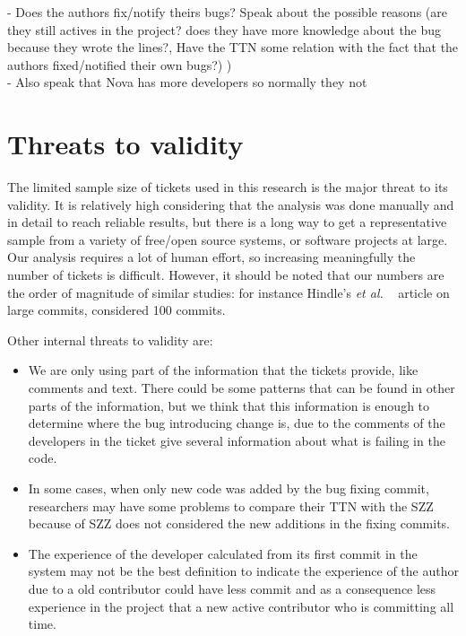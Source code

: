 \documentclass[10pt, conference]{IEEEtran}
\begin{document}
\vspace{0.2cm}
\vspace{0.1cm}

- Does the authors fix/notify theirs bugs? Speak about the possible reasons (are they still actives in the project? does they have more knowledge about the bug because they wrote the lines?, Have the TTN some relation with the fact that the authors fixed/notified their own bugs?) ) \\
- Also speak that Nova has more developers so normally they not 

\section{Threats to validity}
\label{sec:threats}
The limited sample size of tickets used in this research is the major threat to its validity. It is relatively high considering that the analysis was done manually and in detail to reach reliable results, but there is a long way to get a representative sample from a variety of free/open source systems, or software projects at large. Our analysis requires a lot of human effort, so increasing meaningfully the number of tickets is difficult. However, it should be noted that our numbers are the order of magnitude of similar studies: for instance Hindle's \emph{et al.} ~\cite{hindle2008large} article on large commits, considered 100 commits.

Other internal threats to validity are:

\begin{itemize}
    \item We are only using part of the information that the tickets provide, like comments and text. There could be some patterns that can be found in other parts of the information, but we think that this information is enough to determine where the bug introducing change is, due to the comments of the developers in the ticket give several information about what is failing in the code.
    \item In some cases, when only new code was added by the bug fixing commit, researchers may have some problems to compare their TTN with the SZZ because of SZZ does not considered the new additions in the fixing commits. 
    \item The experience of the developer calculated from its first commit in the system may not be the best definition to indicate the experience of the author due to a old contributor could have less commit and as a consequence less experience in the project that a new active contributor who is committing all time.
\end{itemize}
\end{document}
